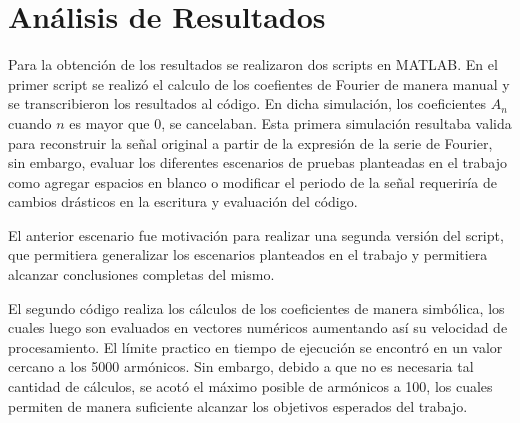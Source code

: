 \documentclass[11pt,a4paper,twocolumn]{article}
\begin{document}

\section*{Análisis de Resultados}
    Para la obtención de los resultados se realizaron dos scripts en MATLAB. En el primer script se 
    realizó el calculo de los coefientes de Fourier de manera manual y se transcribieron los 
    resultados al código. En dicha simulación, los coeficientes $A_n$ cuando $n$ es mayor que 0, se 
    cancelaban. Esta primera simulación resultaba valida para reconstruir la señal original a partir de la 
    expresión de la serie de Fourier, sin embargo, evaluar los diferentes escenarios de pruebas 
    planteadas en el trabajo como agregar espacios en blanco o modificar el periodo de la señal 
    requeriría de cambios drásticos en la escritura y evaluación del código.
    
    El anterior escenario fue motivación para realizar una segunda versión del script, que permitiera 
    generalizar los escenarios planteados en el trabajo y permitiera alcanzar conclusiones completas 
    del mismo.
    
    El segundo código realiza los cálculos de los coeficientes de manera simbólica, los cuales luego son 
    evaluados en vectores numéricos aumentando así su velocidad de procesamiento. El límite 
    practico en tiempo de ejecución se encontró en un valor cercano a los 5000 armónicos. Sin 
    embargo, debido a que no es necesaria tal cantidad de cálculos, se acotó el máximo posible de 
    armónicos a 100, los cuales permiten de manera suficiente alcanzar los objetivos esperados del 
    trabajo.
    
\end{document}
